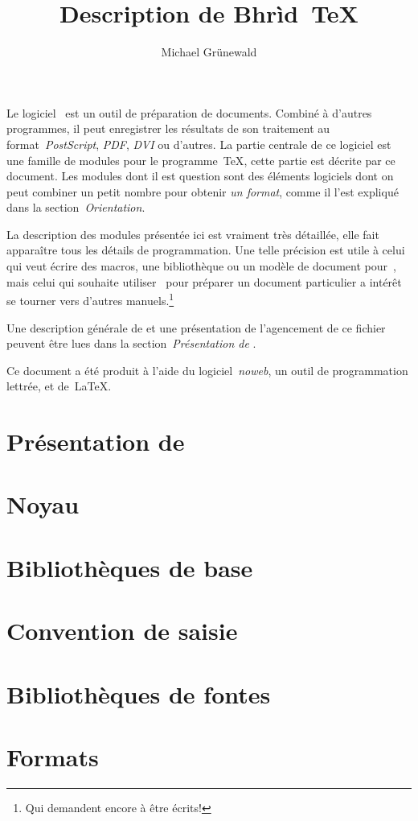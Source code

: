 \documentclass{article}
\title{Description de Bhrìd~\TeX}
\author{Michael Grünewald}
\begin{document}
\maketitle
Le logiciel~{\brTeX} est un outil de préparation de documents. Combiné
à d'autres programmes, il peut enregistrer les résultats de son
traitement au format~\emph{PostScript}, \emph{PDF}, \emph{DVI} ou
d'autres. La partie centrale de ce logiciel est une famille de modules
pour le programme~{\TeX}, cette partie est décrite par ce document. Les
modules dont il est question sont des éléments logiciels dont on peut
combiner un petit nombre pour obtenir \emph{un format}, comme il
l'est expliqué dans la section~\emph{Orientation}.

La description des modules présentée ici est vraiment très détaillée,
elle fait apparaître tous les détails de programmation. Une telle
précision est utile à celui qui veut écrire des macros, une
bibliothèque ou un modèle de document pour~{\brTeX}, mais celui qui
souhaite utiliser~{\brTeX} pour préparer un document particulier
a intérêt se tourner vers d'autres manuels.\footnote{Qui demandent
encore à être écrits!}

Une description générale de {\brTeX} et une présentation de
l'agencement de ce fichier peuvent être lues dans la
section~\emph{Présentation de {\brTeX}}.

Ce document a été produit à l'aide du logiciel~\emph{noweb}, un outil
de programmation lettrée, et de~{\LaTeX}.

\tableofcontents
\part{Présentation de \brTeX}

\part{Noyau}


\part{Bibliothèques de base}






\part{Convention de saisie}





\part{Bibliothèques de fontes}







\part{Formats}





\end{document}
